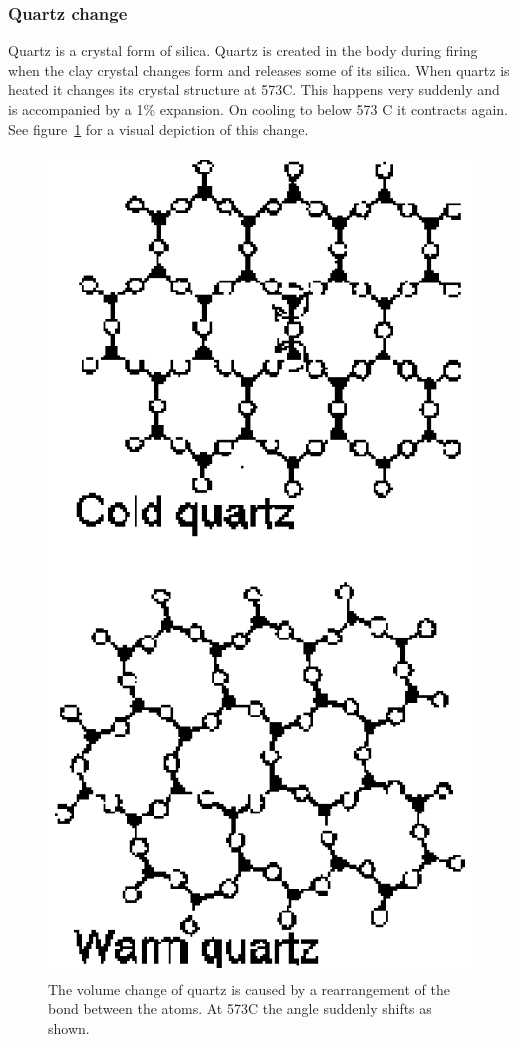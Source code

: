 \subsubsection{Quartz change}
Quartz is a crystal form of silica. Quartz is created in the body during firing 
when the clay crystal changes form and releases some of its silica. When quartz 
is heated it changes its crystal structure at 573\degree C. This happens very 
suddenly and is accompanied by a 1\% expansion. On cooling to below 573\degree 
C it contracts again. See figure~\ref{fig:quartzinversion} for a visual 
depiction of this change.
\begin{figure}[htbp!]
  \centering
  \includegraphics[width=0.6\linewidth]{img/quartzinversion.eps}
  \caption{The volume change of quartz is caused by a rearrangement of the bond 
  between the atoms. At 573\degree C the angle suddenly shifts as shown.}
  \label{fig:quartzinversion}
\end{figure}
